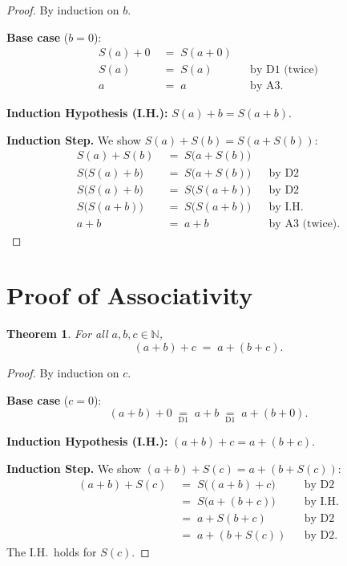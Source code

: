 \documentclass[12pt, a4paper]{article}
\theoremstyle{plain}
\newtheorem{theorem}{Theorem}
\theoremstyle{definition}
\begin{document}
\begin{proof}
By induction on $b$.

\medskip
\noindent\textbf{Base case} ($b = 0$):
\[
\begin{aligned}
  S(a) + 0 &\;=\; S(a + 0)\\
  S(a) &\;=\; S(a) &&\text{by D1 (twice)}\\
  a &\;=\; a &&\text{by A3.}
\end{aligned}
\]

\medskip
\noindent\textbf{Induction Hypothesis (I.H.):} $S(a) + b = S(a + b)$.

\medskip
\noindent\textbf{Induction Step.} We show $S(a) + S(b) = S(a + S(b))$:
\[
\begin{aligned}
  S(a) + S(b) &\;=\; S\bigl(a + S(b)\bigr)\\
  S\bigl(S(a) + b\bigr) &\;=\; S\bigl(a + S(b)\bigr) &&\text{by D2}\\
  S\bigl(S(a) + b\bigr) &\;=\; S\bigl(S(a + b)\bigr) &&\text{by D2}\\
  S\bigl(S(a + b)\bigr) &\;=\; S\bigl(S(a + b)\bigr) &&\text{by I.H.}\\
  a + b &\;=\; a + b &&\text{by A3 (twice).}
\end{aligned}
\]
\qedhere
\end{proof}

\section*{Proof of Associativity}

\begin{theorem}
For all $a, b, c \in \mathbb{N}$,
\[
  (a + b) + c \;=\; a + (b + c).
\]
\end{theorem}

\begin{proof}
By induction on $c$.

\medskip
\noindent\textbf{Base case} ($c = 0$):
\[
  (a + b) + 0
  \;\underset{\mathrm{D1}}{=}\; a + b
  \;\underset{\mathrm{D1}}{=}\; a + (b + 0).
\]

\medskip
\noindent\textbf{Induction Hypothesis (I.H.):}
$(a + b) + c = a + (b + c)$.

\medskip
\noindent\textbf{Induction Step.} We show
$(a + b) + S(c) = a + (b + S(c))$:
\[
\begin{aligned}
  (a + b) + S(c)
    &\;=\; S\bigl((a + b) + c\bigr) &&\text{by D2}\\
    &\;=\; S\bigl(a + (b + c)\bigr)   &&\text{by I.H.}\\
    &\;=\; a + S(b + c)               &&\text{by D2}\\
    &\;=\; a + (b + S(c))             &&\text{by D2.}
\end{aligned}
\]
The I.H.\ holds for $S(c)$. \qedhere
\end{proof}
\end{document}

